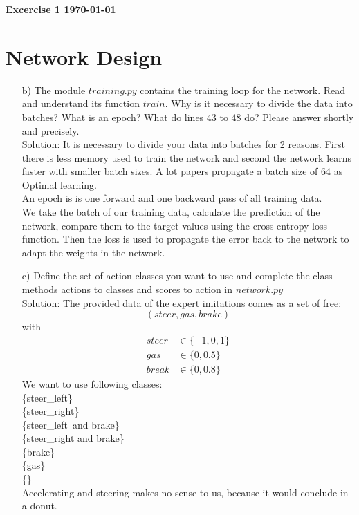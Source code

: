 \documentclass[DIN, pagenumber=false, fontsize=11pt, parskip=half]{scrartcl}
\newcommand{\mytitle}[1]{{\noindent\textbf{#1}}}
\newcommand{\sol}{\underline{Solution:} }
\begin{document}
\mytitle{{\huge Excercise 1} \hfill \today}
\section{Network Design }
\begin{enumerate}
	\item[b)]The module $training.py$ contains the training loop for the network. Read and understand its
	function $train$. Why is it necessary to divide the data into batches? What is an epoch? What do
	lines $43$ to $48$ do? Please answer shortly and precisely.\\
	\sol It is necessary to divide your data into batches for 2 reasons. First there is less memory used to train the network and second the network learns faster with smaller batch sizes. A lot papers propagate a batch size of 64 as Optimal learning.\\
	An epoch is is one forward and one backward pass of all training data.\\
	We take the batch of our training data, calculate the prediction of the network, compare them to the target values using the cross-entropy-loss-function. Then the loss is used to propagate the error back to the network to adapt the weights in the network. 
	\item[c)] Define the set of action-classes you want to use and complete the class-methods actions to classes
	and scores to action in $network.py$\\
	\sol The provided data of the expert imitations comes as a set of free:
	\[(steer,gas,brake)\]
	with
	\begin{align*}
		steer&\in\{-1,0,1\}\\
		gas&\in \{0,0.5\}\\
		break&\in \{0,0.8\}
	\end{align*}
	We want to use following classes:\\ 
		\{steer\_left\}\\
		\{steer\_right\}\\
		\{steer\_left\ and brake\}\\
		\{steer\_right and brake\}\\		
		\{brake\}\\
		\{gas\}\\
		\{\}\\
		Accelerating and steering makes no sense to us, because it would conclude in a donut. 
\end{enumerate}
\end{document}
